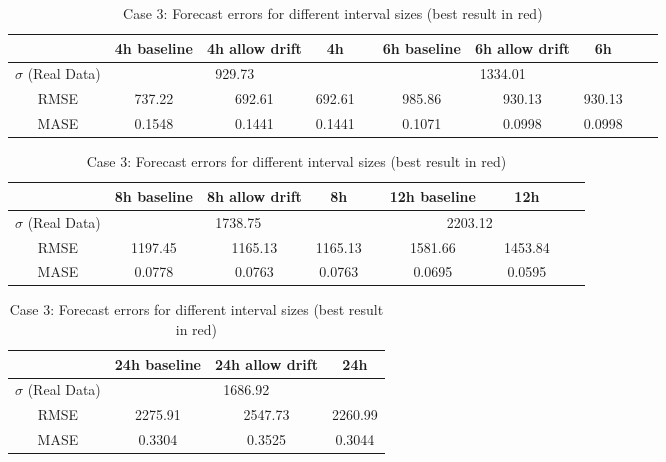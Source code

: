 \begin{table}[!ht]
\footnotesize
\begin{tabular}{c|ccccccccc}
              & 4h baseline & 4h allow drift & 4h     &  & 6h baseline & 6h allow drift & 6h     &  &  \\ \hline
$\sigma$ (Real Data) & \multicolumn{3}{c}{929.73}           &  & \multicolumn{3}{c}{1334.01}           &  &  \\
RMSE          & 737.22      & 692.61         & 692.61 &  & 985.86      & 930.13        & 930.13 &  &  \\
MASE          & 0.1548      & 0.1441         & 0.1441 &  & 0.1071      & 0.0998        & 0.0998 &  & 
\end{tabular}

\vspace{0.5cm}

\begin{tabular}{c|ccccccccc}
              & 8h baseline & 8h allow drift & 8h     &  & 12h baseline & \color{red}{12h allow drift} & 12h     &  &  \\ \hline
$\sigma$ (Real Data) & \multicolumn{3}{c}{1738.75}           &  & \multicolumn{3}{c}{2203.12}           &  &  \\
RMSE          & 1197.45     & 1165.13        & 1165.13  &  & 1581.66     & \color{red}{1453.84}      & 1453.84 &  &  \\
MASE          & 0.0778      & 0.0763         & 0.0763  &  & 0.0695      & \color{red}{0.0595}        & 0.0595 &  & 
\end{tabular}

\vspace{0.5cm}

\begin{tabular}{c|ccc}
              & 24h baseline & 24h allow drift & 24h  \\ \hline
$\sigma$ (Real Data) & \multicolumn{3}{c}{1686.92}     \\
RMSE          & 2275.91     & 2547.73         & 2260.99   \\
MASE          & 0.3304      & 0.3525         & 0.3044 \\
\end{tabular}

\vspace{0.5cm}

\caption{Case 3: Forecast errors for different interval sizes (best result in
red)}\label{tab:case3_interval}
\end{table}


